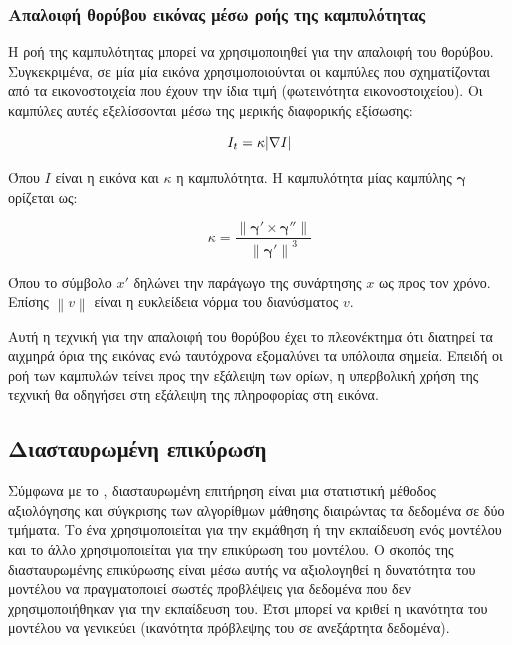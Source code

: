 \documentclass[a4paper,12pt]{article}
\DeclarePairedDelimiter\abs{\lvert}{\rvert}
\newcommand\norm[1]{\left\lVert#1\right\rVert}
\begin{document}
\subsubsection{Απαλοιφή θορύβου εικόνας μέσω ροής της καμπυλότητας}
\label{curvature_flow:1}

Η ροή της καμπυλότητας μπορεί να χρησιμοποιηθεί για την απαλοιφή του θορύβου.
Συγκεκριμένα, σε μία μία εικόνα χρησιμοποιούνται οι καμπύλες που σχηματίζονται
από τα εικονοστοιχεία που έχουν την ίδια τιμή (φωτεινότητα εικονοστοιχείου). Οι
καμπύλες αυτές εξελίσσονται \cite{curvature_flow:1} μέσω της μερικής διαφορικής
εξίσωσης:

\begin{equation} \label{eq:curvature_flow:1}
    I_t = \kappa \abs{\nabla I}
\end{equation}

Όπου $I$ είναι η εικόνα και $\kappa$ η καμπυλότητα. Η καμπυλότητα μίας καμπύλης
$\bm{\gamma}$ ορίζεται ως:

\begin{equation*}
    \kappa = \frac {\norm{\bm{\gamma}' \times \bm{\gamma}''}}
                   {\norm{\bm{\gamma}'}^3}
\end{equation*}

Όπου το σύμβολο $x'$ δηλώνει την παράγωγο της συνάρτησης $x$ ως προς τον χρόνο.
Επίσης $\norm{v}$ είναι η ευκλείδεια νόρμα του διανύσματος $v$.

Αυτή η τεχνική για την απαλοιφή του θορύβου έχει το πλεονέκτημα ότι διατηρεί
τα αιχμηρά όρια της εικόνας ενώ ταυτόχρονα εξομαλύνει τα υπόλοιπα σημεία. Επειδή
οι ροή των καμπυλών τείνει προς την εξάλειψη των ορίων, η υπερβολική χρήση της
τεχνική θα οδηγήσει στη εξάλειψη της πληροφορίας στη εικόνα.

\subsection{Διασταυρωμένη επικύρωση}

Σύμφωνα με το \cite{cross_validation:1}, διασταυρωμένη επιτήρηση είναι μια
στατιστική μέθοδος αξιολόγησης και σύγκρισης των αλγορίθμων μάθησης διαιρώντας
τα δεδομένα σε δύο τμήματα. Το ένα χρησιμοποιείται για την εκμάθηση ή την
εκπαίδευση ενός μοντέλου και το άλλο χρησιμοποιείται για την επικύρωση του
μοντέλου. Ο σκοπός της διασταυρωμένης επικύρωσης είναι μέσω αυτής να αξιολογηθεί
η δυνατότητα του μοντέλου να πραγματοποιεί σωστές προβλέψεις για δεδομένα που
δεν χρησιμοποιήθηκαν για την εκπαίδευση του. Έτσι μπορεί να κριθεί η ικανότητα
του μοντέλου να γενικεύει (ικανότητα πρόβλεψης του σε ανεξάρτητα δεδομένα).
\end{document}
